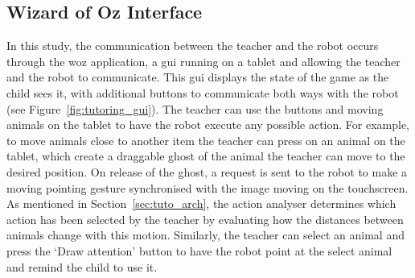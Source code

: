 \subsection{Wizard of Oz Interface} \label{sec:tuto_woz}

In this study, the communication between the teacher and the robot occurs through the \gls{woz} application, a \gls{gui} running on a tablet and allowing the teacher and the robot to communicate. This \gls{gui} displays the state of the game as the child sees it, with additional buttons to communicate both ways with the robot (see Figure~\ref{fig:tutoring_gui}). The teacher can use the buttons and moving animals on the tablet to have the robot execute any possible action. For example, to move animals close to another item the teacher can press on an animal on the tablet, which create a draggable ghost of the animal the teacher can move to the desired position. On release of the ghost, a request is sent to the robot to make a moving pointing gesture synchronised with the image moving on the touchscreen.
As mentioned in Section~\ref{sec:tuto_arch}, the action analyser determines which action has been selected by the teacher by evaluating how the distances between animals change with this motion. Similarly, the teacher can select an animal and press the `Draw attention' button to have the robot point at the select animal and remind the child to use it.
